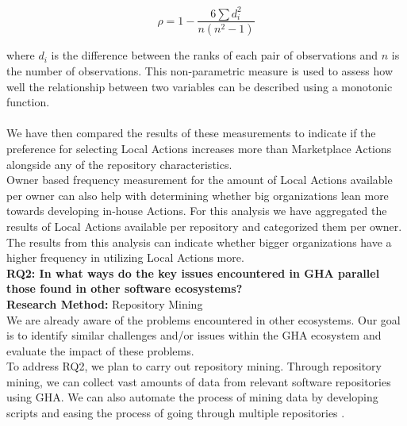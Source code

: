 \documentclass[conference]{IEEEtran}
\begin{document}
            \begin{equation}
            \rho = 1 - \frac{6 \sum d_i^2}{n(n^2 - 1)}
            \end{equation}
            
            where \(d_i\) is the difference between the ranks of each pair of observations and \(n\) is the number of observations. This non-parametric measure is used to assess how well the relationship between two variables can be described using a monotonic function. \\             
            \\ We have then compared the results of these measurements to indicate if the preference for selecting Local Actions increases more than Marketplace Actions alongside any of the repository characteristics. \\
            Owner based frequency measurement for the amount of Local Actions available per owner can also help with determining whether big organizations lean more towards developing in-house Actions. For this analysis we have aggregated the results of Local Actions available per repository and categorized them per owner. The results from this analysis can indicate whether bigger organizations have a higher frequency in utilizing Local Actions more. \\

        \textbf{RQ2: In what ways do the key issues encountered in GHA parallel those found in other software ecosystems?}\\

            \textbf{Research Method:} Repository Mining\\
            We are already aware of the problems encountered in other ecosystems. Our goal is to identify similar challenges and/or issues within the GHA ecosystem and evaluate the impact of these problems.\\
            To address RQ2, we plan to carry out repository mining. Through repository mining, we can collect vast amounts of data from relevant software repositories using GHA. We can also automate the process of mining data by developing scripts\cite{Marof2024}  and easing the process of going through multiple repositories \cite{chaturvedi2013tools}.\\
\end{document}
